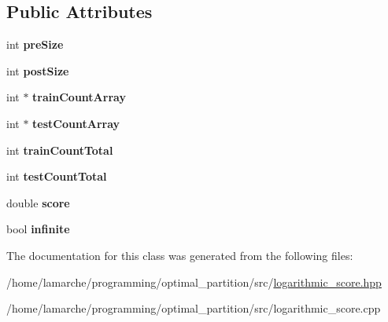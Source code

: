 \subsection*{Public Attributes}
\begin{DoxyCompactItemize}
\item 
\hypertarget{classLogarithmicScoreValue_a553cdae1ae69f229316b73a360589776}{int {\bfseries pre\-Size}}\label{classLogarithmicScoreValue_a553cdae1ae69f229316b73a360589776}

\item 
\hypertarget{classLogarithmicScoreValue_a8b15f92de2d4e003b4a3826c7817b2f8}{int {\bfseries post\-Size}}\label{classLogarithmicScoreValue_a8b15f92de2d4e003b4a3826c7817b2f8}

\item 
\hypertarget{classLogarithmicScoreValue_a7faf693e6b53450f8bdf3d9b8c2bda9b}{int $\ast$ {\bfseries train\-Count\-Array}}\label{classLogarithmicScoreValue_a7faf693e6b53450f8bdf3d9b8c2bda9b}

\item 
\hypertarget{classLogarithmicScoreValue_a3cd25470e851035b0b953ab19d3416e6}{int $\ast$ {\bfseries test\-Count\-Array}}\label{classLogarithmicScoreValue_a3cd25470e851035b0b953ab19d3416e6}

\item 
\hypertarget{classLogarithmicScoreValue_a5bee04d8401da678ac83f77efd0c6e4a}{int {\bfseries train\-Count\-Total}}\label{classLogarithmicScoreValue_a5bee04d8401da678ac83f77efd0c6e4a}

\item 
\hypertarget{classLogarithmicScoreValue_a4a6de49414afc11d8505313d385f8552}{int {\bfseries test\-Count\-Total}}\label{classLogarithmicScoreValue_a4a6de49414afc11d8505313d385f8552}

\item 
\hypertarget{classLogarithmicScoreValue_aaeac28c5557929803745879f6a1e65d7}{double {\bfseries score}}\label{classLogarithmicScoreValue_aaeac28c5557929803745879f6a1e65d7}

\item 
\hypertarget{classLogarithmicScoreValue_a1cc8b1248437817c7c8055bd0e8d0161}{bool {\bfseries infinite}}\label{classLogarithmicScoreValue_a1cc8b1248437817c7c8055bd0e8d0161}

\end{DoxyCompactItemize}


The documentation for this class was generated from the following files\-:\begin{DoxyCompactItemize}
\item 
/home/lamarche/programming/optimal\-\_\-partition/src/\hyperlink{logarithmic__score_8hpp}{logarithmic\-\_\-score.\-hpp}\item 
/home/lamarche/programming/optimal\-\_\-partition/src/logarithmic\-\_\-score.\-cpp\end{DoxyCompactItemize}
